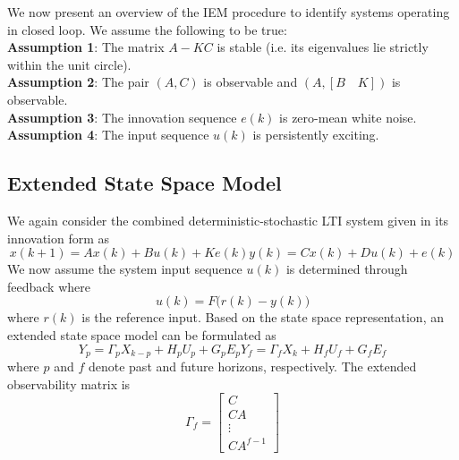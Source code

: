 We now present an overview of the IEM procedure to identify systems operating in closed loop. We assume the following to be true:\\
\textbf{Assumption 1}: The matrix $A - KC$ is stable (i.e. its eigenvalues lie strictly within the unit circle).\\
\textbf{Assumption 2}: The pair $(A,C)$ is observable and $(A, [B \quad K])$ is observable.\\
\textbf{Assumption 3}: The innovation sequence $e(k)$ is zero-mean white noise.\\
\textbf{Assumption 4}: The input sequence $u(k)$ is persistently exciting.

\subsection{Extended State Space Model}\label{sec:extended_state_space_model}
We again consider the combined deterministic-stochastic LTI system given in its innovation form as
\begin{subequations}
\begin{equation}x(k+1) = Ax(k) + Bu(k) + Ke(k)\end{equation}
\begin{equation}y(k) = Cx(k) + Du(k) + e(k)\end{equation}
\end{subequations}
We now assume the system input sequence $u(k)$ is determined through feedback where
\begin{equation*}
u(k) = F\big( r(k) - y(k)\big)
\end{equation*}
where $r(k)$ is the reference input. Based on the state space representation, an extended state space model can be formulated as
\begin{subequations}
\begin{equation}Y_p = \Gamma_p X_{k-p} + H_p U_p + G_p E_p\end{equation}
\begin{equation}Y_f = \Gamma_f X_k + H_f U_f + G_f E_f\end{equation}
\end{subequations}
where $p$ and $f$ denote past and future horizons, respectively. The extended observability matrix is
\begin{equation*}
\Gamma_f = \begin{bmatrix}C\\ CA\\ \vdots\\ CA^{f-1}\end{bmatrix}
\end{equation*}

